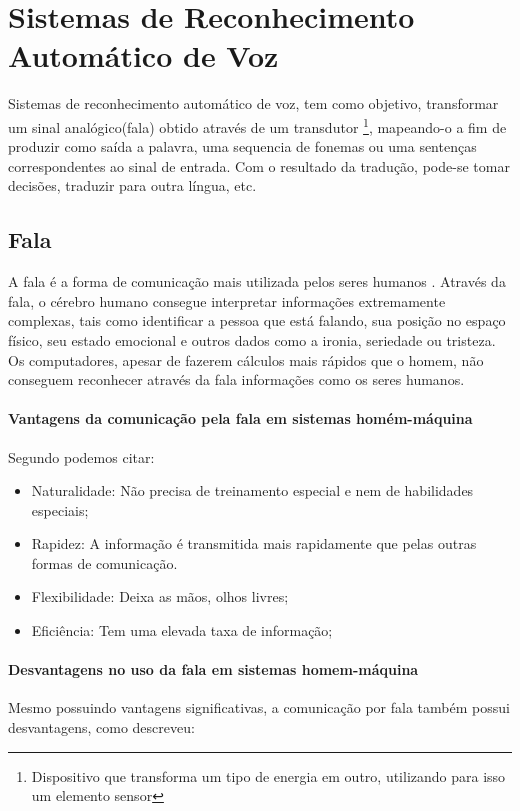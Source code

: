 \chapter{Sistemas de Reconhecimento Automático de Voz}

Sistemas de reconhecimento automático de voz, tem como objetivo, transformar um sinal analógico(fala) obtido através de um transdutor \footnote{Dispositivo que transforma um tipo de energia em outro, utilizando para isso um elemento sensor}, mapeando-o a fim de produzir como saída a palavra, uma sequencia de fonemas ou uma sentenças correspondentes ao sinal de entrada. Com o resultado da tradução, pode-se tomar decisões, traduzir para outra língua, etc.

\section{Fala}
A fala é a forma de comunicação mais utilizada pelos seres humanos \cite{RavCorporaCarlos}. Através da fala, o cérebro humano consegue interpretar informações extremamente complexas, tais como identificar a pessoa que está falando, sua posição no espaço físico, seu estado emocional e outros dados como a ironia, seriedade ou tristeza. Os computadores, apesar de fazerem cálculos mais rápidos que o homem, não conseguem reconhecer através da fala informações como os seres humanos.

\subsubsection{Vantagens da comunicação pela fala em sistemas homém-máquina}

Segundo  podemos citar:

\begin{itemize}
\item Naturalidade: Não precisa de treinamento especial e nem de habilidades especiais;
\item Rapidez: A informação é transmitida mais rapidamente que pelas outras formas de comunicação.
\item Flexibilidade: Deixa as mãos, olhos livres;
\item Eficiência: Tem uma elevada taxa de informação;
\end{itemize}

\subsubsection{Desvantagens no uso da fala em sistemas homem-máquina}
Mesmo possuindo vantagens significativas, a comunicação por fala também possui desvantagens, como  descreveu:


